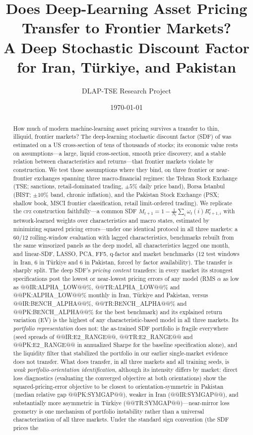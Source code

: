 \documentclass[12pt]{article}
\title{\bfseries Does Deep-Learning Asset Pricing Transfer to Frontier Markets?\\
A Deep Stochastic Discount Factor for Iran, T\"urkiye, and Pakistan}
\author{DLAP-TSE Research Project}
\date{\today}
\begin{document}
\maketitle

\begin{abstract}
\noindent How much of modern machine-learning asset pricing survives a transfer to thin, illiquid, frontier markets? The deep-learning stochastic discount factor (SDF) of \citet{cpz2024} was estimated on a US cross-section of tens of thousands of stocks; its economic value rests on assumptions---a large, liquid cross-section, smooth price discovery, and a stable relation between characteristics and returns---that frontier markets violate by construction. We test those assumptions where they bind, on three frontier or near-frontier exchanges spanning three macro-financial regimes: the Tehran Stock Exchange (TSE; sanctions, retail-dominated trading, $\pm5\%$ daily price band), Borsa Istanbul (BIST; $\pm10\%$ band, chronic inflation), and the Pakistan Stock Exchange (PSX; shallow book, MSCI frontier classification, retail limit-ordered trading). We replicate the \textsc{cpz} construction faithfully---a common SDF $M_{t+1}=1-\frac{1}{N_t}\sum_i\omega_t(i)R^e_{t+1,i}$ with network-learned weights over characteristics and macro states, estimated by minimizing squared pricing errors---under one identical protocol in all three markets: a 60/12 rolling-window evaluation with lagged characteristics, benchmarks rebuilt from the same winsorized panels as the deep model, all characteristics lagged one month, and linear-SDF, LASSO, PCA, FF5, q-factor and market benchmarks (12 test windows in Iran, 6 in T\"urkiye and 6 in Pakistan, forced by factor availability). The transfer is sharply split. The deep SDF's \emph{pricing content} transfers: in every market its strongest specifications post the lowest or near-lowest pricing errors of any model (RMS $\alpha$ as low as @@IR:ALPHA_LOW@@\%, @@TR:ALPHA_LOW@@\% and @@PK:ALPHA_LOW@@\% monthly in Iran, T\"urkiye and Pakistan, versus @@IR:BENCH_ALPHA@@\%, @@TR:BENCH_ALPHA@@\% and @@PK:BENCH_ALPHA@@\% for the best benchmark) and its explained return variation (EV) is the highest of any characteristic-based model in all three markets. Its \emph{portfolio representation} does not: the as-trained SDF portfolio is fragile everywhere (seed spreads of @@IR:E2_RANGE@@, @@TR:E2_RANGE@@ and @@PK:E2_RANGE@@ in annualized Sharpe for the baseline specification alone), and the liquidity filter that stabilized the portfolio in our earlier single-market evidence does not transfer. What does transfer, in all three markets and all training seeds, is \emph{weak portfolio-orientation identification}, although its intensity differs by market: direct loss diagnostics (evaluating the converged objective at both orientations) show the squared-pricing-error objective to be closest to orientation-symmetric in Pakistan (median relative gap @@PK:SYMGAP@@), weaker in Iran (@@IR:SYMGAP@@), and substantially more asymmetric in T\"urkiye (@@TR:SYMGAP@@)---near-mirror loss geometry is one mechanism of portfolio instability rather than a universal characterization of all three markets. Under the standard sign convention (the SDF prices the 
\end{abstract}
\end{document}
